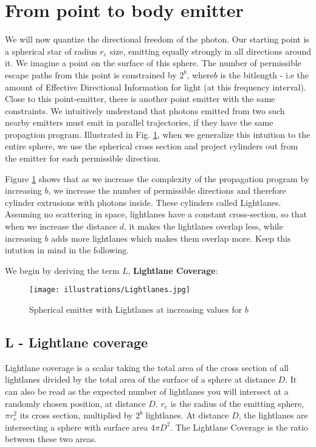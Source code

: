 \documentclass[notitlepage]{article}
\begin{document}
\section*{From point to body emitter}
We will now quantize the directional freedom of the photon. Our starting point is a spherical star of radius $r_e$ size, emitting equally strongly in all  directions around it. We imagine a point on the surface of this sphere. The number of permissible escape paths from this point is constrained  by $2^b$, where$ b$ is the bitlength - i.e the amount of Effective Directional Information for light (at this frequency interval). Close to this point-emitter, there is another point emitter with the same constraints.  We intuitively understand that photons emitted from two such nearby emitters must emit in parallel trajectories, if they have the same propagtion program. Illustrated in Fig. \ref{fig:sphericalEmitter}, when we generalize this intuition to the entire sphere, we use the spherical cross section and project cylinders out from the emitter for each permissible direction.

Figure \ref{fig:sphericalEmitter} shows that as we increase the complexity of the propagation program by increasing $b$, we increase the number of permissible directions and therefore cylinder extrusions with photons inside. These cylinders called Lightlanes. Assuming no scattering in space, lightlanes have a constant cross-section, so that when we increase the distance $d$, it makes the lightlanes overlap less, while increasing $b$ adds more lightlanes which makes them overlap more. Keep this intution in mind in the following.

We begin by deriving the term $L$, \textbf{Lightlane Coverage}:


\begin{figure}
\centering
{\texttt{[image: illustrations/Lightlanes.jpg]}}
\caption{Spherical emitter with Lightlanes at increasing values for $b$}
\label{fig:sphericalEmitter}
\end{figure}


\subsection{L - Lightlane coverage}
Lightlane coverage is a scalar taking the total area of the cross section of all lightlanes divided by the total area of the surface of a sphere at distance $D$. It can also be read as the expected number of lightlanes you will intersect at a randomly chosen position, at distance $D$. $r_e$ is the radius of the emitting sphere,  $\pi r_e^2$ its cross section, multiplied by $2^b$ lightlanes. At distance $D$, the lightlanes are intersecting a sphere with surface area $4\pi D^2$. The Lightlane Coverage is the ratio between these two areas. 
\end{document}
